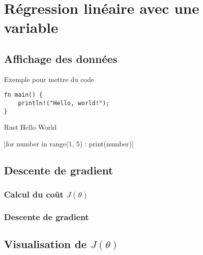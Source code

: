 \section{Régression linéaire avec une variable}
\subsection{Affichage des données}

Exemple pour mettre du code 

\begin{listing}[!ht]
\begin{verbatim}
fn main() {
    println!("Hello, world!");
}    
\end{verbatim}
\caption{Rust Hello World}
\end{listing}

|for number in range(1, 5) : print(number)|

    

\subsection{Descente de gradient}
\subsubsection{Calcul du coût $J(\theta)$}
\subsubsection{Descente de gradient}
\subsection{Visualisation de $J(\theta)$}



